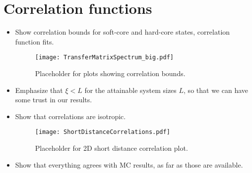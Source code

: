 
\section{Correlation functions}



\begin{itemize}
\item Show correlation bounds for soft-core and hard-core states, correlation function fits.

\begin{figure}[H]
	\centering
	\texttt{[image: TransferMatrixSpectrum\_big.pdf]}
	\caption{Placeholder for plots showing correlation bounds.}
	\label{fig:TMS}
\end{figure}

\item Emphasize that $\xi < L$ for the attainable system sizes $L$, so that we can have some trust in our results.
\item Show that correlations are isotropic.

\begin{figure}[H]
	\centering
	\texttt{[image: ShortDistanceCorrelations.pdf]}
	\caption{Placeholder for 2D short distance correlation plot.}
	\label{fig:ShortCorr}
\end{figure}

\item Show that everything agrees with MC results, as far as those are available.
\end{itemize}


